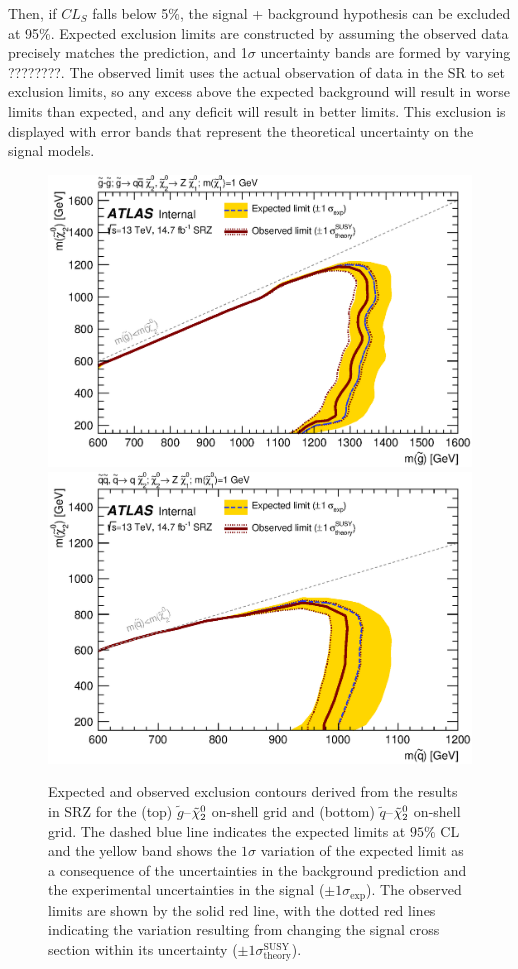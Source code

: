 Then, if $CL_S$ falls below 5\%, the signal + background hypothesis can be excluded at 95\%. Expected exclusion limits are constructed by assuming the observed data precisely matches the prediction, and 1$\sigma$ uncertainty bands are formed by varying ????????. The observed limit uses the actual observation of data in the \ac{SR} to set exclusion limits, so any excess above the expected background will result in worse limits than expected, and any deficit will result in better limits. This exclusion is displayed with error bands that represent the theoretical uncertainty on the signal models. 

\begin{figure}[!htb]
\centering
\includegraphics[width=.8\textwidth]{figures/interpretation/excl_SM_GG_N2_1.eps}
\includegraphics[width=.8\textwidth]{figures/interpretation/excl_SM_SS_N2.eps}  
\caption{
Expected and observed exclusion contours derived from the results in SRZ for the (top) $\tilde{g}$--$\tilde{\chi}_2^0$ on-shell grid and (bottom) $\tilde{q}$--$\tilde{\chi}_2^0$ on-shell grid. 
The dashed blue line indicates the expected limits at $95\%$ CL and the yellow band shows the $1\sigma$ variation of the expected limit as a consequence of the uncertainties in the background prediction and the experimental uncertainties in the signal ($\pm1\sigma_\text{exp}$). 
The observed limits are shown by the solid red line, with the dotted red lines indicating the variation resulting from changing the signal cross section within its uncertainty ($\pm1\sigma^\text{SUSY}_\text{theory}$). \label{fig:excl_SMGGN2_1}
}
\end{figure}



